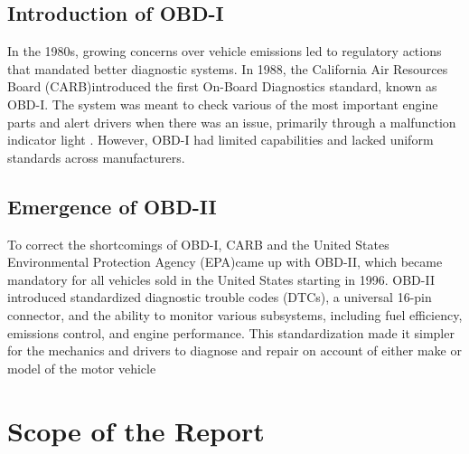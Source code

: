 \documentclass[12pt,a4paper]{report}
\begin{document}


\subsection{Introduction of OBD-I}

\hspace*{1cm}In the 1980s, growing concerns over vehicle emissions led to regulatory actions that mandated better diagnostic systems. In 1988, the California Air Resources Board (CARB)\footnotemark[3] introduced the first On-Board Diagnostics standard, known as OBD-I. The system was meant to check various of the most important engine parts and alert drivers when there was an issue, primarily through a malfunction indicator light . However, OBD-I had limited capabilities and lacked uniform standards across manufacturers.


\subsection{Emergence of OBD-II}

\hspace*{1cm}To correct  the shortcomings of OBD-I, CARB and the United States Environmental Protection Agency (EPA)\footnotemark[4] came up with OBD-II, which became mandatory for all vehicles sold in the United States starting in 1996. OBD-II introduced standardized diagnostic trouble codes (DTCs), a universal 16-pin connector, and the ability to monitor various subsystems, including fuel efficiency, emissions control, and engine performance. This
standardization made it simpler for the mechanics and drivers to diagnose and repair on account of either make or model of the motor vehicle


\section{Scope of the Report}
\end{document}

